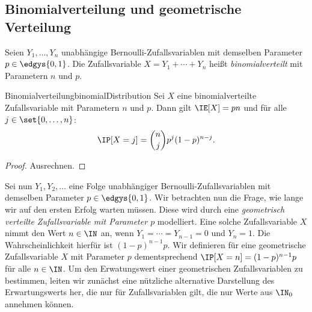\documentclass[language=ngerman,algolist]{TemplateLecture}
\begin{document}
\subsection{Binomialverteilung und geometrische Verteilung}

Seien $Y_1, \ldots, Y_n$ unabhängige Bernoulli-Zufallsvariablen mit demselben Parameter $p \in \edgys{0,1}$. Die Zufallsvariable $X = Y_1 + \cdots + Y_n$ heißt \emph{binomialverteilt} mit Parametern $n$ und $p$.

\begin{thm}{Binomialverteilung}{binomialDistribution}
    Sei $X$ eine binomialverteilte Zufallsvariable mit Parametern $n$ und $p$. Dann gilt $\IE[X] = pn$ und für alle $j \in \set{0, \ldots, n}$:
    \begin{equation*}
        \IP[X = j] = \binom{n}{j} p^j (1-p)^{n-j}.
    \end{equation*}    
\end{thm}

\begin{proof}
    Ausrechnen.
\end{proof}

Sei nun $Y_1, Y_2, \ldots$ eine Folge unabhängiger Bernoulli-Zufallsvariablen mit demselben Parameter $p \in \edgys{0,1}$. Wir betrachten nun die Frage, wie lange wir auf den ersten Erfolg warten müssen. Diese wird durch eine \emph{geometrisch verteilte Zufallsvariable mit Parameter $p$} modelliert. Eine solche Zufallsvariable $X$ nimmt den Wert $n \in \IN$ an, wenn $Y_1 = \cdots = Y_{n-1} = 0$ und $Y_n = 1$. Die Wahrscheinlichkeit hierfür ist $(1-p)^{n-1} p$. Wir definieren für eine geometrische Zufallsvariable $X$ mit Parameter $p$ dementsprechend $\IP[X = n] = (1-p)^{n-1} p$ für alle $n \in \IN$. Um den Erwatungswert einer geometrischen Zufallsvariablen zu bestimmen, leiten wir zunächst eine nützliche alternative Darstellung des Erwartungswerts her, die nur für Zufallsvariablen gilt, die nur Werte aus $\IN_0$ annehmen können.
\end{document}
